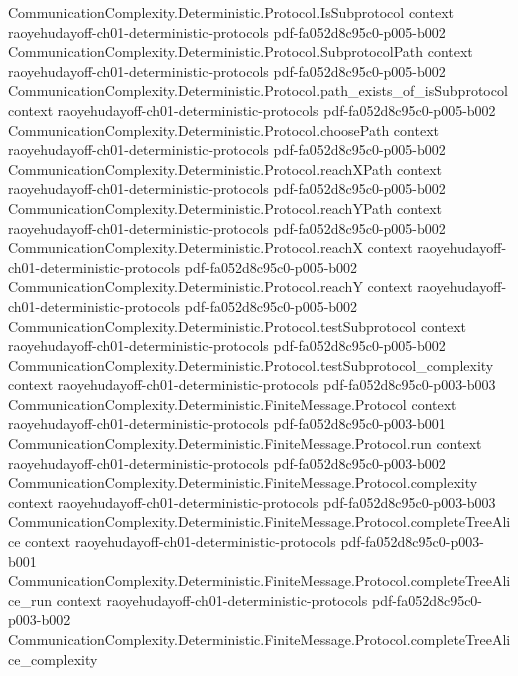 \begin{theorem}
\proofstep
  {CommunicationComplexity.Deterministic.Protocol.IsSubprotocol}
  {context}
  {raoyehudayoff-ch01-deterministic-protocols}
  {pdf-fa052d8c95c0-p005-b002}
\proofstep
  {CommunicationComplexity.Deterministic.Protocol.SubprotocolPath}
  {context}
  {raoyehudayoff-ch01-deterministic-protocols}
  {pdf-fa052d8c95c0-p005-b002}
\proofstep
  {CommunicationComplexity.Deterministic.Protocol.path_exists_of_isSubprotocol}
  {context}
  {raoyehudayoff-ch01-deterministic-protocols}
  {pdf-fa052d8c95c0-p005-b002}
\proofstep
  {CommunicationComplexity.Deterministic.Protocol.choosePath}
  {context}
  {raoyehudayoff-ch01-deterministic-protocols}
  {pdf-fa052d8c95c0-p005-b002}
\proofstep
  {CommunicationComplexity.Deterministic.Protocol.reachXPath}
  {context}
  {raoyehudayoff-ch01-deterministic-protocols}
  {pdf-fa052d8c95c0-p005-b002}
\proofstep
  {CommunicationComplexity.Deterministic.Protocol.reachYPath}
  {context}
  {raoyehudayoff-ch01-deterministic-protocols}
  {pdf-fa052d8c95c0-p005-b002}
\proofstep
  {CommunicationComplexity.Deterministic.Protocol.reachX}
  {context}
  {raoyehudayoff-ch01-deterministic-protocols}
  {pdf-fa052d8c95c0-p005-b002}
\proofstep
  {CommunicationComplexity.Deterministic.Protocol.reachY}
  {context}
  {raoyehudayoff-ch01-deterministic-protocols}
  {pdf-fa052d8c95c0-p005-b002}
\proofstep
  {CommunicationComplexity.Deterministic.Protocol.testSubprotocol}
  {context}
  {raoyehudayoff-ch01-deterministic-protocols}
  {pdf-fa052d8c95c0-p005-b002}
\proofstep
  {CommunicationComplexity.Deterministic.Protocol.testSubprotocol_complexity}
  {context}
  {raoyehudayoff-ch01-deterministic-protocols}
  {pdf-fa052d8c95c0-p003-b003}
\proofstep
  {CommunicationComplexity.Deterministic.FiniteMessage.Protocol}
  {context}
  {raoyehudayoff-ch01-deterministic-protocols}
  {pdf-fa052d8c95c0-p003-b001}
\proofstep
  {CommunicationComplexity.Deterministic.FiniteMessage.Protocol.run}
  {context}
  {raoyehudayoff-ch01-deterministic-protocols}
  {pdf-fa052d8c95c0-p003-b002}
\proofstep
  {CommunicationComplexity.Deterministic.FiniteMessage.Protocol.complexity}
  {context}
  {raoyehudayoff-ch01-deterministic-protocols}
  {pdf-fa052d8c95c0-p003-b003}
\proofstep
  {CommunicationComplexity.Deterministic.FiniteMessage.Protocol.completeTreeAlice}
  {context}
  {raoyehudayoff-ch01-deterministic-protocols}
  {pdf-fa052d8c95c0-p003-b001}
\proofstep
  {CommunicationComplexity.Deterministic.FiniteMessage.Protocol.completeTreeAlice_run}
  {context}
  {raoyehudayoff-ch01-deterministic-protocols}
  {pdf-fa052d8c95c0-p003-b002}
\proofstep
  {CommunicationComplexity.Deterministic.FiniteMessage.Protocol.completeTreeAlice_complexity}

\end{theorem}
